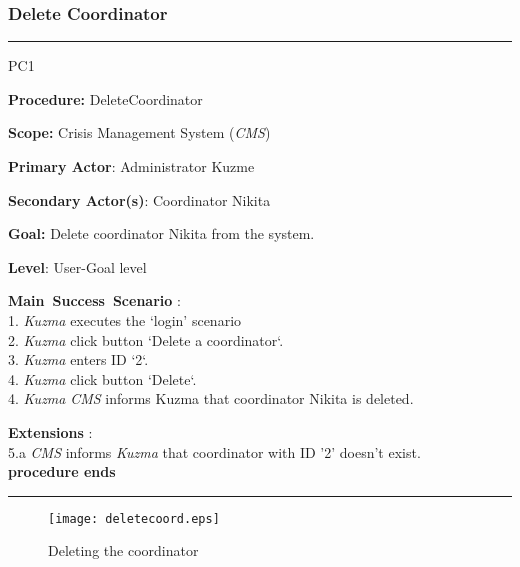 \subsubsection{Delete Coordinator}
\vspace{0.5cm}
\hrule
\begin{lyxlist}{PC1}
\small{
\item [\textbf{Procedure:}] DeleteCoordinator
\item [\textbf{Scope:}] Crisis Management System (\emph{CMS})
\item [\textbf{Primary Actor}:] Administrator Kuzme
\item [\textbf{Secondary Actor(s)}:] Coordinator Nikita
\item [\textbf{Goal:}] Delete coordinator Nikita from the system.
\item [\textbf{Level}:] User-Goal level
\item [\textbf{Main~Success~Scenario}]:\\
1. \emph{Kuzma} executes the `login' scenario\\
2. \emph{Kuzma} click button `Delete a coordinator`.\\
3. \emph{Kuzma} enters ID `2`. \\
4. \emph{Kuzma} click button `Delete`. \\
4. \emph{Kuzma} \emph{CMS} informs Kuzma that coordinator Nikita is deleted. 
\item [\textbf{Extensions}]:\\
5.a \emph{CMS} informs \emph{Kuzma} that coordinator with ID '2' doesn't
exist.\\ \hspace*{0.5cm} \textbf{procedure ends}
}
\end{lyxlist}
\hrule
\vspace{0.5cm}

\begin{figure}[h]
    \texttt{[image: deletecoord.eps]}
	\caption{Deleting the coordinator}
\end{figure}


